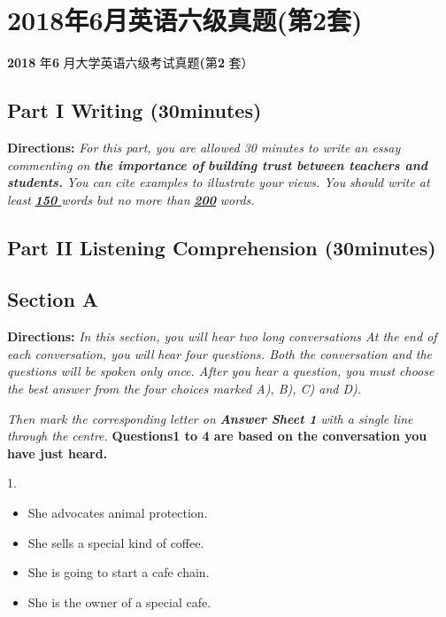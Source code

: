 \documentclass[UTF8,11pt]{ctexart}
\begin{document}
\section*{2018年6月英语六级真题(第2套)}
\textbf{2018} 年\textbf{6} 月大学英语六级考试真题\textbf{(}第\textbf{2} 套）


\subsection*{\textbf{Part I} \textbf{Writing} \textbf{(30minutes)}}


\textbf{Directions:}\textit{ For this part, you are allowed 30 minutes to write an essay commenting on}\textbf{\textit{ the importance of}} \textbf{\textit{building trust between teachers and students.}}\textit{ You can cite examples to illustrate your views. You} \textit{should write at least}\textbf{\textit{ }}\textbf{\textit{\uline{150}}}\textit{\uline{ }}\textit{words but no more than}\textbf{\textit{ }}\textbf{\textit{\uline{200}}} \textit{words.}


\subsection*{\textbf{Part II} \textbf{Listening} \textbf{Comprehension} \textbf{(30minutes)}}


\subsection*{\textbf{Section A}}


\textbf{Directions:}\textit{ In this section, you will hear two long conversations At the end of each conversation, you will} \textit{hear four questions. Both the conversation and the questions will be spoken only once. After you} \textit{hear a question, you must choose the best answer from the four choices marked A), B), C) and D).}


\textit{Then mark the corresponding letter on}\textbf{\textit{ Answer Sheet 1}}\textit{ with a single line through the} \textit{centre.} \textbf{Questions1 to 4 are based on the conversation you have just heard.}


1.


\begin{itemize}[leftmargin=2em,itemsep=.2em,topsep=.4em]\item[A.] She advocates animal protection.
\item[B.] She sells a special kind of coffee.
\item[C.] She is going to start a cafe chain.
\item[D.] She is the owner of a special cafe.
\end{itemize}
\end{document}
